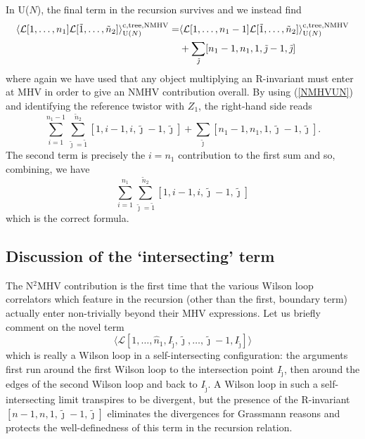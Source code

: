 \documentclass[12pt]{article}
\numberwithin{equation}{section}
\begin{document}
In U($N$), the final term in the recursion survives and we instead find
\begin{align}
\langle \mathcal{L}[1,\ldots,n_1] \mathcal{L}[\tilde{1},\ldots,\tilde{n}_2] \rangle^{\rm c,tree, NMHV}_{{\rm U}(N)} = &\langle \mathcal{L}[1,\ldots,n_1-1] \mathcal{L}[\tilde{1},\ldots,\tilde{n}_2] \rangle^{\rm c, tree, NMHV}_{{\rm U}(N)}\notag \\
&+\sum_{\tilde{\jmath}}[n_1-1,n_1,1,\tilde{\jmath}-1,\tilde{\jmath}]
\end{align}
where again we have used that any object multiplying an R-invariant must enter at MHV in order to give an NMHV contribution overall. By using (\ref{NMHVUN}) and identifying the reference twistor with \(Z_1\), the right-hand side reads
\begin{equation}
\sum_{i=1}^{n_1-1} \sum_{\tilde{\jmath}=\tilde{1}}^{\tilde{n}_2} [1, i-1, i, \tilde{\jmath}-1,\tilde{\jmath}] + \sum_{\tilde{\jmath}}[n_1-1,n_1,1,\tilde{\jmath}-1,\tilde{\jmath}].
\end{equation}
The second term is precisely the \(i=n_1\) contribution to the first sum and so, combining, we have
\begin{equation}
\sum_{i=1}^{n_1} \sum_{\tilde{\jmath}=\tilde{1}}^{\tilde{n}_2} [1, i-1, i, \tilde{\jmath}-1,\tilde{\jmath}]
\end{equation}
which is the correct formula. 

\subsection{Discussion of the `intersecting' term}
The N\(^2\)MHV contribution is the first time that the various Wilson loop correlators which feature in the recursion (other than the first, boundary term) actually enter non-trivially beyond their MHV expressions. Let us briefly comment on the novel term
\begin{equation}
[n-1,n,1,\tilde{\jmath}-1,\tilde{\jmath}]\langle \mathcal{L}[1,\ldots,\hat{n}_1,I_{\tilde{\jmath}},\tilde{\jmath},\ldots,\tilde{\jmath}-1,I_{\tilde{\jmath}}]\rangle
\end{equation}
which is really a Wilson loop in a self-intersecting configuration: the arguments first run around the first Wilson loop to the intersection point \(I_{\tilde{\jmath}}\), then around the edges of the second Wilson loop and back to \(I_{\tilde{\jmath}}\). A Wilson loop in such a self-intersecting limit transpires to be divergent, but the presence of the R-invariant \([n-1,n,1,\tilde{\jmath}-1,\tilde{\jmath}]\) eliminates the divergences for Grassmann reasons and protects the well-definedness of this term in the recursion relation. 
\end{document}
